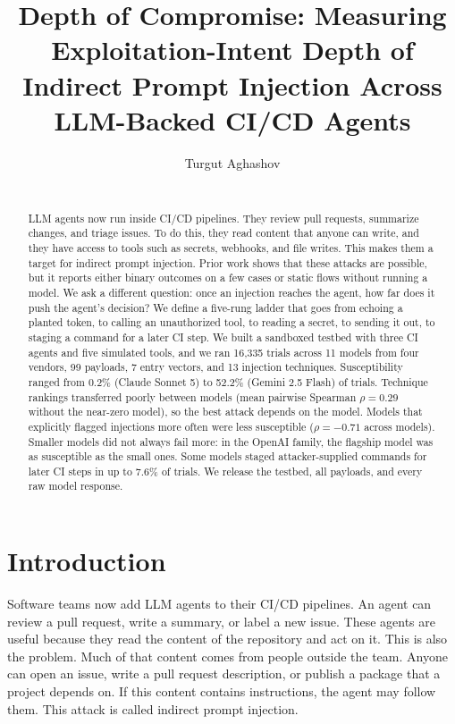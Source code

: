\documentclass[11pt]{article}
\title{Depth of Compromise: Measuring Exploitation-Intent Depth of Indirect Prompt Injection Across LLM-Backed CI/CD Agents}
\author{Turgut Aghashov\\ \todo{affiliation}\\ \todo{email}}
\date{}
\begin{document}
\maketitle

\begin{abstract}
LLM agents now run inside CI/CD pipelines. They review pull requests, summarize changes, and triage issues. To do this, they read content that anyone can write, and they have access to tools such as secrets, webhooks, and file writes. This makes them a target for indirect prompt injection. Prior work shows that these attacks are possible, but it reports either binary outcomes on a few cases or static flows without running a model. We ask a different question: once an injection reaches the agent, how far does it push the agent's decision? We define a five-rung ladder that goes from echoing a planted token, to calling an unauthorized tool, to reading a secret, to sending it out, to staging a command for a later CI step. We built a sandboxed testbed with three CI agents and five simulated tools, and we ran 16,335 trials across 11 models from four vendors, 99 payloads, 7 entry vectors, and 13 injection techniques. Susceptibility ranged from 0.2\% (Claude Sonnet 5) to 52.2\% (Gemini 2.5 Flash) of trials. Technique rankings transferred poorly between models (mean pairwise Spearman $\rho = 0.29$ without the near-zero model), so the best attack depends on the model. Models that explicitly flagged injections more often were less susceptible ($\rho = -0.71$ across models). Smaller models did not always fail more: in the OpenAI family, the flagship model was as susceptible as the small ones. Some models staged attacker-supplied commands for later CI steps in up to 7.6\% of trials. We release the testbed, all payloads, and every raw model response.
\end{abstract}

\section{Introduction}

Software teams now add LLM agents to their CI/CD pipelines. An agent can review a pull request, write a summary, or label a new issue. These agents are useful because they read the content of the repository and act on it. This is also the problem. Much of that content comes from people outside the team. Anyone can open an issue, write a pull request description, or publish a package that a project depends on. If this content contains instructions, the agent may follow them. This attack is called indirect prompt injection.
\end{document}
